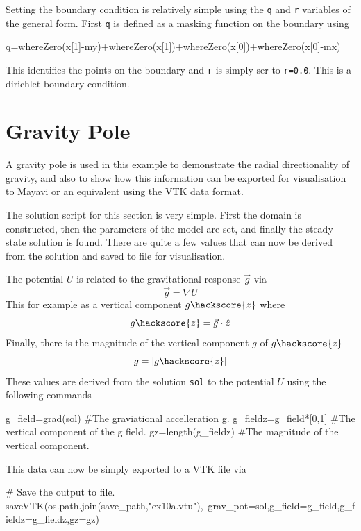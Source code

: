 Setting the boundary condition is relatively simple using the \verb!q! and
\verb!r! variables of the general form. First \verb!q! is defined as a masking
function on the boundary using
\begin{python}
q=whereZero(x[1]-my)+whereZero(x[1])+whereZero(x[0])+whereZero(x[0]-mx)
\end{python}
This identifies the points on the boundary and \verb!r! is simply
ser to \verb!r=0.0!. This is a dirichlet boundary condition.

\section{Gravity Pole}
A gravity pole is used in this example to demonstrate the radial directionality
of gravity, and also to show how this information can be exported for
visualisation to Mayavi or an equivalent using the VTK data format. 

The solution script for this section is very simple. First the domain is
constructed, then the parameters of the model are set, and finally the steady
state solution is found. There are quite a few values that can now be derived
from the solution and saved to file for visualisation.

The potential $U$ is related to the gravitational response $\vec{g}$ via
\begin{equation}
\vec{g} = \nabla U
\end{equation}
This for example as a vertical component $g\hackscore{z}$ where
\begin{equation}
g\hackscore{z}=\vec{g}\cdot\hat{z}
\end{equation}
Finally, there is the magnitude of the vertical component $g$ of
$g\hackscore{z}$
\begin{equation}
g=|g\hackscore{z}|
\end{equation}
These values are derived from the \esc solution \verb!sol! to the potential $U$
using the following commands
\begin{python}
g_field=grad(sol) #The graviational accelleration g.
g_fieldz=g_field*[0,1] #The vertical component of the g field.
gz=length(g_fieldz) #The magnitude of the vertical component.
\end{python}
This data can now be simply exported to a VTK file via
\begin{python}
# Save the output to file.
saveVTK(os.path.join(save_path,"ex10a.vtu"),\
        grav_pot=sol,g_field=g_field,g_fieldz=g_fieldz,gz=gz)
\end{python}

